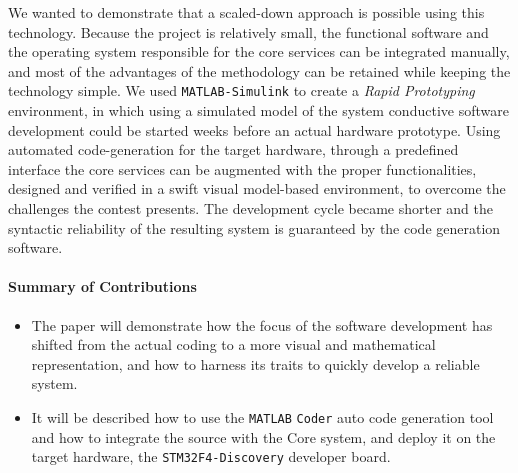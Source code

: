 
We wanted to demonstrate that a scaled-down approach is possible using this technology. Because the project is relatively small, the functional software and the operating system responsible for the core services can be integrated manually, and most of the advantages of the methodology can be retained while keeping the technology simple. We used \verb!MATLAB-Simulink! to create a \emph{Rapid Prototyping} environment, in which using a simulated model of the system conductive software development could be started weeks before an actual hardware prototype. Using automated code-generation for the target hardware, through a predefined interface the core services can be augmented with the proper functionalities, designed and verified in a swift visual model-based environment, to overcome the challenges the contest presents. The development cycle became shorter and the syntactic reliability of the resulting system is guaranteed by the code generation software.

\paragraph{Summary of Contributions}
\begin{itemize}
\item The paper will demonstrate how the focus of the software development has shifted from the actual coding to a more visual and mathematical representation, and how to harness its traits to quickly develop a reliable system.
\item It will be described how to use the \verb!MATLAB! \verb!Coder! auto code generation tool and how to integrate the source with the Core system, and deploy it on the target hardware, the \verb!STM32F4-Discovery! developer board.
\end{itemize}